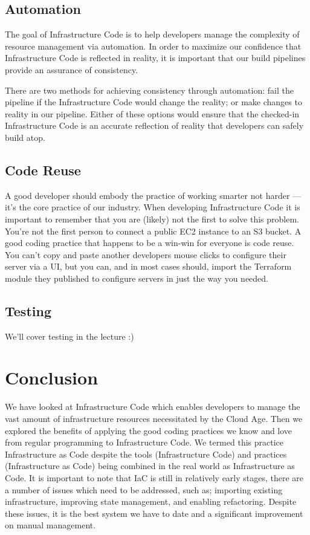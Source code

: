 \subsection{Automation}
The goal of Infrastructure Code is to help developers manage the complexity of resource management via automation.
In order to maximize our confidence that Infrastructure Code is reflected in reality,
it is important that our build pipelines provide an assurance of consistency.

There are two methods for achieving consistency through automation: fail the pipeline if the Infrastructure Code would change the reality; or make changes to reality in our pipeline.
Either of these options would ensure that the checked-in Infrastructure Code is an accurate reflection of reality that developers can safely build atop.

\subsection{Code Reuse}
A good developer should embody the practice of working smarter not harder ---
it's the core practice of our industry.
When developing Infrastructure Code it is important to remember that you are (likely) not the first to solve this problem.
You're not the first person to connect a public EC2 instance to an S3 bucket.
A good coding practice that happens to be a win-win for everyone is code reuse.
You can't copy and paste another developers mouse clicks to configure their server via a UI,
but you can, and in most cases should,
import the Terraform module they published to configure servers in just the way you needed.

\subsection{Testing}
We'll cover testing in the lecture :)

\section{Conclusion}
We have looked at Infrastructure Code which enables developers to manage the vast amount of infrastructure resources necessitated by the Cloud Age.
Then we explored the benefits of applying the good coding practices we know and love from regular programming to Infrastructure Code.
We termed this practice Infrastructure as Code despite the tools (Infrastructure Code) and practices (Infrastructure as Code) being combined in the real world as Infrastructure as Code.
It is important to note that IaC is still in relatively early stages,
there are a number of issues which need to be addressed, such as; importing existing infrastructure, improving state management, and enabling refactoring.
Despite these issues,
it is the best system we have to date and a significant improvement on manual management.

